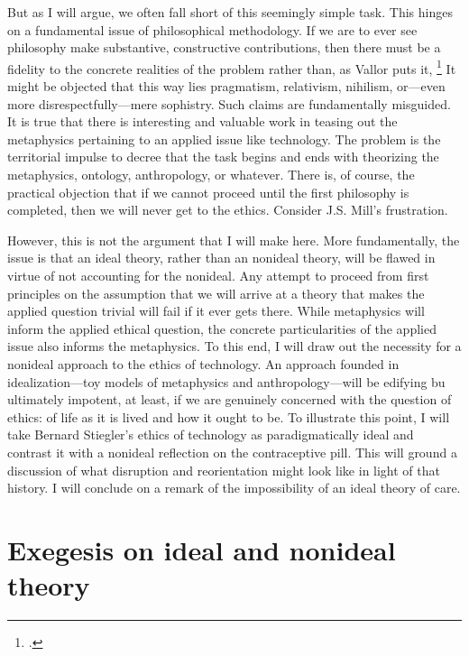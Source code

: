 \documentclass[letterpaper,notitlepage,12pt]{article}
\begin{document}
But as I will argue, we often fall short of this seemingly simple task.
This hinges on a fundamental issue of philosophical methodology.
If we are to ever see philosophy make substantive, constructive contributions,
  then there must be a fidelity to the concrete realities of the problem rather
  than, as Vallor puts it, \footcite[p. 33]{vallor_technology_2018}
It might be objected that this way lies pragmatism, relativism, nihilism,
or---even more disrespectfully---mere sophistry.
Such claims are fundamentally misguided.
It is true that there is interesting and valuable work in teasing out the
metaphysics pertaining to an applied issue like technology.
The problem is the territorial impulse to decree that the task begins and ends
with theorizing the metaphysics, ontology, anthropology, or whatever.
There is, of course, the practical objection that if we cannot proceed until the
first philosophy is completed, then we will never get to the ethics.
Consider J.S. Mill's frustration.

However, this is not the argument that I will make here.
More fundamentally, the issue is that an ideal theory, rather than an nonideal
theory, will be flawed in virtue of not accounting for the nonideal.
Any attempt to proceed from first principles on the assumption that we will
arrive at a theory that makes the applied question trivial will fail if it ever
gets there.
While metaphysics will inform the applied ethical question, the concrete
particularities of the applied issue also informs the metaphysics.
To this end, I will draw out the necessity for a nonideal approach to the ethics
of technology.
An approach founded in idealization---toy models of metaphysics and
anthropology---will be edifying bu ultimately impotent, at least, if we are
genuinely concerned with the question of ethics: of life as it is lived and how
it ought to be.
To illustrate this point, I will take Bernard Stiegler's ethics of technology as
paradigmatically ideal and contrast it with a nonideal reflection on the
contraceptive pill.
This will ground a discussion of what disruption and reorientation might look
like in light of that history.
I will conclude on a remark of the impossibility of an ideal theory of care.

\section{Exegesis on ideal and nonideal theory}
\end{document}
